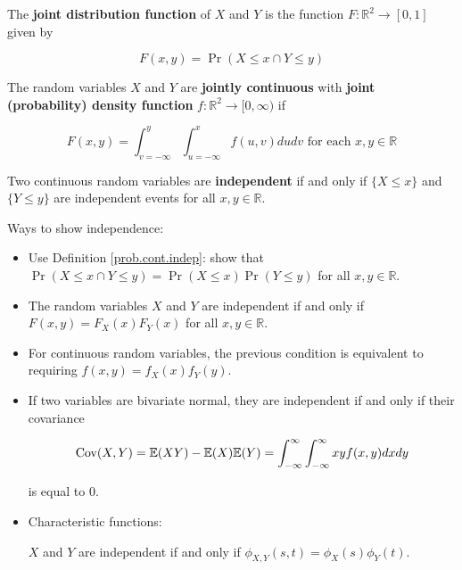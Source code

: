 \begin{definition} The \textbf{joint distribution function} of \(X\) and \(Y\) is the function \(F: \mathbb{R}^2 \to [0, 1]\) given by

\[
F(x, y) = \Pr(X \leq x \cap Y \leq y)
\]

\end{definition}

\begin{definition}

The random variables \(X\) and \(Y\) are \textbf{jointly continuous} with \textbf{joint (probability) density function} \(f: \mathbb{R}^2 \to [0, \infty)\) if

\[
F(x, y) = \int_{v=-\infty}^y \int_{u=-\infty}^x f(u, v) du dv \text{ for each } x, y \in \mathbb{R}
\]

\end{definition}

\begin{definition} \label{prob.cont.indep} Two continuous random variables are \textbf{independent} if and only if \(\{X \leq x\}\) and \(\{Y \leq y\}\) are independent events for all \(x, y \in \mathbb{R}\). \end{definition}

Ways to show independence:

\begin{itemize}

\item Use Definition \ref{prob.cont.indep}: show that \(\Pr(X \leq x \cap Y \leq y) = \Pr(X \leq x) \Pr(Y \leq y)\) for all \(x, y \in \mathbb{R}\).

\item \begin{theorem}The random variables \(X\) and \(Y\) are independent if and only if  \(F(x, y) = F_X(x) F_Y(x)\) for all \(x, y \in \mathbb{R}\). \end{theorem}

\item \begin{proposition}For continuous random variables, the previous condition is equivalent to requiring \(f(x,y) = f_X(x) f_Y(y)\).\end{proposition}

\item \begin{theorem}\label{prob.bivariate.norm.indep} If two variables are bivariate normal, they are independent if and only if their covariance

\[
\Cov(X, Y) = \E(XY) - \E(X)\E(Y) = \int_{-\infty}^\infty \int_{-\infty}^\infty xy f(x, y) dx dy
\]

is equal to 0. \end{theorem}

\item Characteristic functions: \begin{theorem}\(X\) and \(Y\) are independent if and only if \(\phi_{X,Y}(s,t) = \phi_X(s) \phi_Y(t)\).\end{theorem}

\end{itemize}

